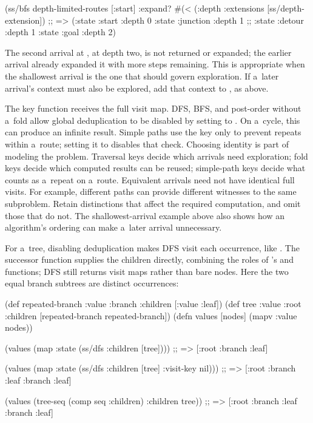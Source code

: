 (ss/bfs depth-limited-routes [:start]
        {:expand? #(< (:depth %
         :extensions [ss/depth-extension]})
;; => ({:state :start :depth 0} {:state :junction :depth 1}
;;     {:state :detour :depth 1} {:state :goal :depth 2})
\endtt

The second arrival at , at depth two, is not returned or
expanded; the earlier arrival already expanded it with more steps remaining.
This is appropriate when the shallowest arrival is the one that should
govern exploration. If a~later arrival's context must also be explored, add
that context to , as above.

The key function receives the full visit map. DFS, BFS, and post-order
without a~fold allow global deduplication to be disabled by setting
 to . On a~cycle, this can produce an infinite
result. Simple paths use the key only to prevent repeats within a~route;
setting it to  disables that check.
Choosing identity is part of modeling the problem. Traversal keys decide
which arrivals need exploration; fold keys decide which computed results
can be reused; simple-path keys decide what counts as a~repeat on a~route.
Equivalent arrivals need not have identical full visits. For example,
different paths can provide different witnesses to the same subproblem.
Retain distinctions that affect the required computation, and omit those
that do not. The shallowest-arrival example above also shows how an
algorithm's ordering can make a~later arrival unnecessary.

For a~tree, disabling deduplication makes DFS visit each occurrence, like
. The successor function supplies the children
directly, combining the roles of 's  and
 functions; DFS still returns visit maps rather than bare
nodes. Here the two equal branch subtrees are distinct occurrences:

\begtt {}
(def repeated-branch {:value :branch
                      :children [{:value :leaf}]})
(def tree {:value :root
           :children [repeated-branch repeated-branch]})
(defn values [nodes] (mapv :value nodes))

(values (map :state (ss/dfs :children [tree])))
;; => [:root :branch :leaf]

(values (map :state (ss/dfs :children [tree] {:visit-key nil})))
;; => [:root :branch :leaf :branch :leaf]

(values (tree-seq (comp seq :children) :children tree))
;; => [:root :branch :leaf :branch :leaf]

